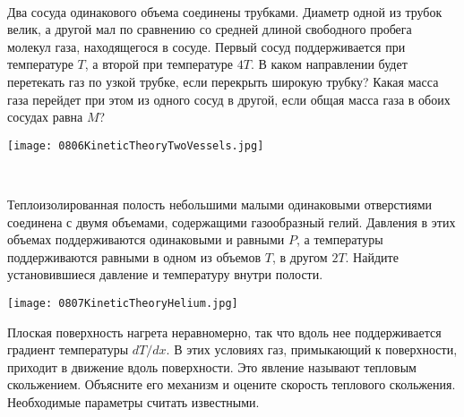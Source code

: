 \begin{ex}
\hspace{0pt} \\
\begin{minipage}{.65\textwidth}
Два сосуда одинакового объема соединены трубками. Диаметр одной из трубок велик, 
а другой мал по сравнению со средней длиной свободного пробега молекул газа, находящегося в сосуде. 
Первый сосуд поддерживается при температуре $T$, а второй при температуре $4T$. 
В каком направлении будет перетекать газ по узкой трубке, если перекрыть широкую трубку? 
Какая масса газа перейдет при этом из одного сосуд в другой, если общая масса газа в обоих сосудах равна $M$?
\end{minipage}
\begin{minipage}{.35\textwidth}
\centering
\texttt{[image: 0806KineticTheoryTwoVessels.jpg]}
\end{minipage}
\begin{ans}
\end{ans}
\end{ex}

\begin{ex}
\hspace{0pt} \\
\begin{minipage}{.65\textwidth}
Теплоизолированная полость небольшими малыми одинаковыми отверстиями соединена с двумя объемами, содержащими газообразный гелий. 
Давления в этих объемах поддерживаются одинаковыми и равными $P$, а температуры поддерживаются равными в одном из объемов $T$, в другом $2T$. 
Найдите установившиеся давление и температуру внутри полости.
\end{minipage}
\begin{minipage}{.35\textwidth}
\centering
\texttt{[image: 0807KineticTheoryHelium.jpg]}
\end{minipage}
\begin{ans}
\end{ans}
\end{ex}

\begin{ex}
Плоская поверхность нагрета неравномерно, так что вдоль нее поддерживается градиент температуры $dT/dx$. 
В этих условиях газ, примыкающий к поверхности, приходит в движение вдоль поверхности. Это явление называют тепловым скольжением. 
Объясните его механизм и оцените скорость теплового скольжения. Необходимые параметры считать известными.
\begin{ans}
\end{ans}
\end{ex}

